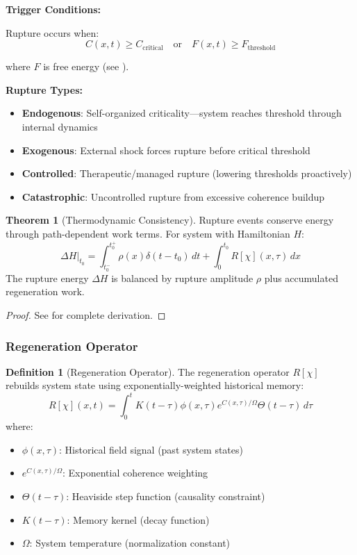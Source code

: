 \documentclass[11pt,a4paper]{article}
\theoremstyle{definition}
\newtheorem{definition}{Definition}[section]
\newtheorem{theorem}{Theorem}[section]
\theoremstyle{remark}
\begin{document}
\textbf{Trigger Conditions:}

Rupture occurs when:
\begin{equation}
C(x,t) \geq C_{\text{critical}} \quad \text{or} \quad F(x,t) \geq F_{\text{threshold}}
\label{eq:rupture-condition}
\end{equation}

where $F$ is free energy (see ).

\textbf{Rupture Types:}
\begin{itemize}
\item \textbf{Endogenous}: Self-organized criticality—system reaches threshold through internal dynamics
\item \textbf{Exogenous}: External shock forces rupture before critical threshold
\item \textbf{Controlled}: Therapeutic/managed rupture (lowering thresholds proactively)
\item \textbf{Catastrophic}: Uncontrolled rupture from excessive coherence buildup
\end{itemize}

\begin{theorem}[Thermodynamic Consistency]
Rupture events conserve energy through path-dependent work terms. For system with Hamiltonian $H$:
\begin{equation}
\Delta H|_{t_0} = \int_{t_0^-}^{t_0^+} \rho(x) \delta(t-t_0)\,dt + \int_0^{t_0} R[\chi](x,\tau)\,dx
\label{eq:energy-conservation}
\end{equation}
The rupture energy $\Delta H$ is balanced by rupture amplitude $\rho$ plus accumulated regeneration work.
\end{theorem}

\begin{proof}
See  for complete derivation.
\end{proof}

\subsubsection{Regeneration Operator}

\begin{definition}[Regeneration Operator]
The regeneration operator $R[\chi]$ rebuilds system state using exponentially-weighted historical memory:
\begin{equation}
R[\chi](x,t) = \int_0^t K(t-\tau) \phi(x,\tau) e^{C(x,\tau)/\Omega} \Theta(t-\tau)\,d\tau
\label{eq:regeneration}
\end{equation}
where:
\begin{itemize}
\item $\phi(x,\tau)$: Historical field signal (past system states)
\item $e^{C(x,\tau)/\Omega}$: Exponential coherence weighting
\item $\Theta(t-\tau)$: Heaviside step function (causality constraint)
\item $K(t-\tau)$: Memory kernel (decay function)
\item $\Omega$: System temperature (normalization constant)
\end{itemize}
\end{definition}
\end{document}
